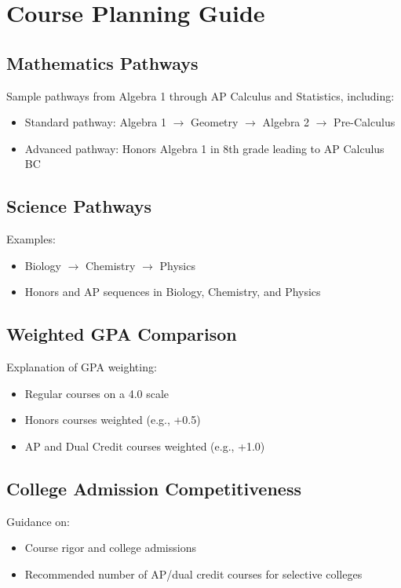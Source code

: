 \documentclass[12pt,oneside]{book}
\begin{document}
\appendix

\chapter{Course Planning Guide}

\section{Mathematics Pathways}
Sample pathways from Algebra 1 through AP Calculus and Statistics, including:
\begin{itemize}[leftmargin=2em]
    \item Standard pathway: Algebra 1 $\rightarrow$ Geometry $\rightarrow$ Algebra 2 $\rightarrow$ Pre-Calculus
    \item Advanced pathway: Honors Algebra 1 in 8th grade leading to AP Calculus BC
\end{itemize}

\section{Science Pathways}
Examples:
\begin{itemize}[leftmargin=2em]
    \item Biology $\rightarrow$ Chemistry $\rightarrow$ Physics
    \item Honors and AP sequences in Biology, Chemistry, and Physics
\end{itemize}

\section{Weighted GPA Comparison}
Explanation of GPA weighting:
\begin{itemize}[leftmargin=2em]
    \item Regular courses on a 4.0 scale
    \item Honors courses weighted (e.g., +0.5)
    \item AP and Dual Credit courses weighted (e.g., +1.0)
\end{itemize}

\section{College Admission Competitiveness}
Guidance on:
\begin{itemize}[leftmargin=2em]
    \item Course rigor and college admissions
    \item Recommended number of AP/dual credit courses for selective colleges
\end{itemize}
\end{document}
